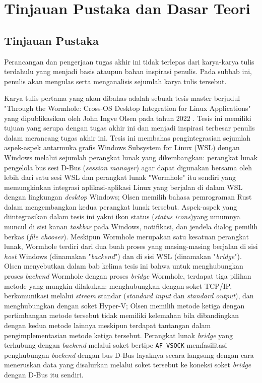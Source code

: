 \chapter{Tinjauan Pustaka dan Dasar Teori}

\section{Tinjauan Pustaka}

Perancangan dan pengerjaan tugas akhir ini tidak terlepas dari karya-karya tulis terdahulu yang menjadi basis ataupun bahan inspirasi penulis. Pada subbab ini, penulis akan mengulas serta menganalisis sejumlah karya tulis tersebut.

Karya tulis pertama yang akan dibahas adalah sebuah tesis master berjudul "Through the Wormhole: Cross-OS Desktop Integration for Linux Applications" yang dipublikasikan oleh John Ingve Olsen pada tahun 2022 \cite{olsen-2022-through-the-wormhole}. Tesis ini memiliki tujuan yang serupa dengan tugas akhir ini dan menjadi inspirasi terbesar penulis dalam merancang tugas akhir ini. Tesis ini membahas pengintegrasian sejumlah aspek-aspek antarmuka grafis Windows Subsystem for Linux (WSL) dengan Windows melalui sejumlah perangkat lunak yang dikembangkan: perangkat lunak pengelola bus sesi D-Bus (\textit{session manager}) agar dapat digunakan bersama oleh lebih dari satu sesi WSL dan perangkat lunak "Wormhole" itu sendiri yang memungkinkan integrasi aplikasi-aplikasi Linux yang berjalan di dalam WSL dengan lingkungan \textit{desktop} Windows; Olsen memilih bahasa pemrograman Rust dalam mengembangkan kedua perangkat lunak tersebut. Aspek-aspek yang diintegrasikan dalam tesis ini yakni ikon status (\textit{status icons})yang umumnya muncul di sisi kanan \textit{taskbar} pada Windows, notifikasi, dan jendela dialog pemilih berkas (\textit{file chooser}). Meskipun Wormhole merupakan satu kesatuan perangkat lunak, Wormhole terdiri dari dua buah proses yang masing-masing berjalan di sisi \textit{host} Windows (dinamakan "\textit{backend}") dan di sisi WSL (dinamakan "\textit{bridge}"). Olsen menyebutkan dalam bab kelima tesis ini bahwa untuk menghubungkan proses \textit{backend} Wormhole dengan proses \textit{bridge} Wormhole, terdapat tiga pilihan metode yang mungkin dilakukan: menghubungkan dengan soket TCP/IP, berkomunikasi melalui \textit{stream} standar (\textit{standard input} dan \textit{standard output}), dan menghubungkan dengan soket Hyper-V; Olsen memilih metode ketiga dengan pertimbangan metode tersebut tidak memiliki kelemahan bila dibandingkan dengan kedua metode lainnya meskipun terdapat tantangan dalam pengimplementasian metode ketiga tersebut. Perangkat lunak \textit{bridge} yang terhubung dengan \textit{backend} melalui soket bertipe \verb|AF_VSOCK| memfasilitasi penghubungan \textit{backend} dengan bus D-Bus layaknya secara langsung dengan cara meneruskan data yang disalurkan melalui soket tersebut ke koneksi soket \textit{bridge} dengan D-Bus itu sendiri.

